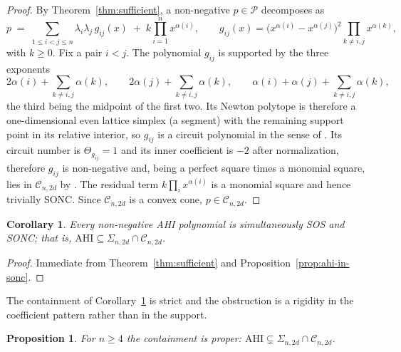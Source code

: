 \documentclass[12pt]{elsarticle}
\newtheorem{proposition}[theorem]{Proposition}
\newtheorem{corollary}[theorem]{Corollary}
\theoremstyle{definition}
\newcommand{\AHI}{\mathrm{AHI}}
\newcommand{\SONC}{\mathcal{C}}
\begin{document}
\begin{proof}
By Theorem~\ref{thm:sufficient}, a non-negative $p\in\mathcal{P}$ decomposes as
\begin{equation}\label{eq:ahi-sonc-decomp}
p \;=\; \sum_{1\le i<j\le n} \lambda_i\lambda_j\,g_{ij}(x) \;+\; k\prod_{i=1}^n x^{\alpha(i)},
\qquad
g_{ij}(x)=\big(x^{\alpha(i)}-x^{\alpha(j)}\big)^2\!\!\prod_{k\neq i,j}\! x^{\alpha(k)},
\end{equation}
with $k\ge 0$. Fix a pair $i<j$. The polynomial $g_{ij}$ is supported by the three exponents
\[
2\alpha(i)+\!\!\sum_{k\neq i,j}\!\alpha(k),\qquad
2\alpha(j)+\!\!\sum_{k\neq i,j}\!\alpha(k),\qquad
\alpha(i)+\alpha(j)+\!\!\sum_{k\neq i,j}\!\alpha(k),
\]
the third being the midpoint of the first two. Its Newton polytope is therefore a one-dimensional even lattice simplex (a segment) with the remaining support point in its relative interior, so $g_{ij}$ is a circuit polynomial in the sense of \citep[Section~1]{iliman2016amoebas}. Its circuit number is $\Theta_{g_{ij}}=1$ and its inner coefficient is $-2$ after normalization, therefore $g_{ij}$ is non-negative and, being a perfect square times a monomial square, lies in $\SONC_{n,2d}$ by \citep[Theorem~3.8]{iliman2016amoebas}. The residual term $k\prod_i x^{\alpha(i)}$ is a monomial square and hence trivially SONC. Since $\SONC_{n,2d}$ is a convex cone, $p\in\SONC_{n,2d}$.
\end{proof}

\begin{corollary}\label{cor:ahi-both}
Every non-negative AHI polynomial is simultaneously SOS and SONC; that is,
$\AHI \subseteq \Sigma_{n,2d}\cap\SONC_{n,2d}$.
\end{corollary}

\begin{proof}
Immediate from Theorem~\ref{thm:sufficient} and Proposition~\ref{prop:ahi-in-sonc}.
\end{proof}

The containment of Corollary~\ref{cor:ahi-both} is strict and the obstruction is a rigidity in the coefficient pattern rather than in the support.

\begin{proposition}\label{prop:proper}
For $n\ge 4$ the containment is proper: $\AHI \subsetneq \Sigma_{n,2d}\cap\SONC_{n,2d}$.
\end{proposition}
\end{document}
